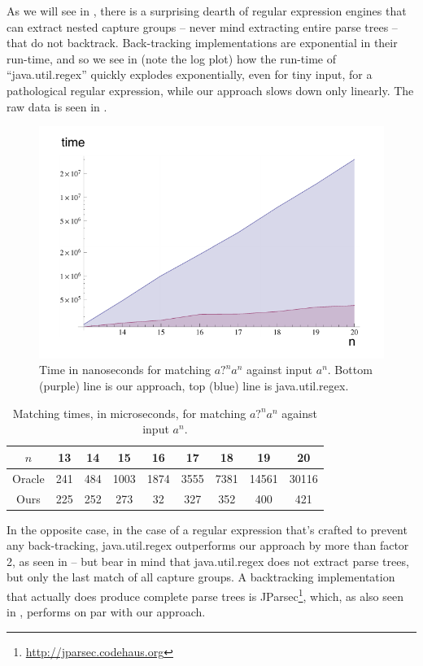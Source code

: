 \documentclass[english]{sigplanconf}
\theoremstyle{definition}
\begin{document}
As we will see in , there is a surprising dearth
of regular expression engines that can extract nested capture groups
-- never mind extracting entire parse trees -- that do not backtrack.
Back-tracking implementations are exponential in their run-time,
and so we see in  (note the log plot) how the run-time
of ``java.util.regex'' quickly explodes exponentially, even for tiny input, for
a pathological regular expression, while our approach slows down
only linearly. The raw data is seen in .

\begin{figure}[htp]
\includegraphics[width=\linewidth]{graphs/pathological-with-axes.pdf}
\caption{Time in nanoseconds for matching $\textit{a?}^n\textit{a}^n$ against input $\textit{a}^n$. Bottom (purple) line is our approach, top (blue) line is java.util.regex.}
\end{figure}

\begin{table}[htp]
\begin{tabular}{ccccccccc}
\toprule
$n$ & 13 & 14 & 15 & 16 & 17 & 18 & 19 & 20\tabularnewline
\midrule
Oracle & 241 & 484 & 1003 & 1874 & 3555 & 7381 & 14561 & 30116\tabularnewline
Ours & 225 & 252 & 273 & 32 & 327 & 352 & 400 & 421\tabularnewline
\bottomrule
\end{tabular}
\caption{Matching times, in microseconds, for matching $\textit{a?}^n\textit{a}^n$ against input $\textit{a}^n$.}
\end{table}

In the opposite case, in the case of a regular expression that's
crafted to prevent any back-tracking, java.util.regex outperforms
our approach by more than factor 2, as seen in  -- but
bear in mind that java.util.regex does not extract parse trees, but
only the last match of all capture groups.  A backtracking
implementation that actually does produce complete parse trees is
JParsec\footnote{\url{http://jparsec.codehaus.org}}, which, as also
seen in , performs on par with our approach. 
\end{document}

